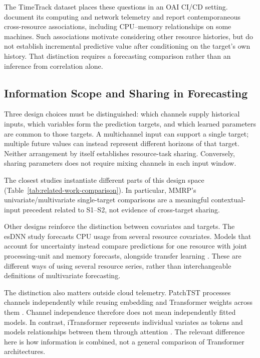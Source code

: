 \documentclass[a4paper,fleqn]{cas-dc}
\begin{document}
The TimeTrack dataset places these questions in an OAI CI/CD setting.
\citet{Meliani2025TimeTrack} document its computing and network telemetry and
report contemporaneous cross-resource associations, including CPU--memory
relationships on some machines. Such associations motivate considering other
resource histories, but do not establish incremental predictive value after
conditioning on the target's own history. That distinction requires a
forecasting comparison rather than an inference from correlation alone.

\subsection{Information Scope and Sharing in Forecasting}
\label{sec:rw-information-sharing}

Three design choices must be distinguished: which channels supply historical
inputs, which variables form the prediction targets, and which learned
parameters are common to those targets. A multichannel input can support a
single target; multiple future values can instead represent different horizons
of that target. Neither arrangement by itself establishes resource-task
sharing. Conversely, sharing parameters does not require mixing channels in
each input window.

The closest studies instantiate different parts of this design space
(Table~\ref{tab:related-work-comparison}). In particular, MMRP's
univariate/multivariate single-target comparisons
\citep{Tripathi2025MMRP} are a meaningful contextual-input precedent
related to S1--S2, not evidence of cross-target sharing.

Other designs reinforce the distinction between covariates and targets.
The esDNN study forecasts CPU usage from several resource covariates.
Models that account for uncertainty instead compare predictions for one
resource with joint processing-unit and memory forecasts, alongside transfer
learning
\citep{Xu2022esDNN,Rossi2025CloudUncertainty}. These are different ways of
using several resource series, rather than interchangeable definitions of
multivariate forecasting.

The distinction also matters outside cloud telemetry. PatchTST processes
channels independently while reusing embedding and Transformer weights across
them \citep{Nie2023PatchTST}. Channel independence therefore does not mean
independently fitted models. In contrast, iTransformer represents individual
variates as tokens and models relationships between them through attention
\citep{Liu2024iTransformer}. The relevant difference here is how information
is combined, not a general comparison of Transformer architectures.
\end{document}
